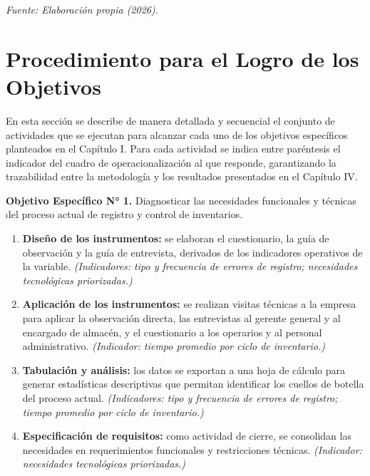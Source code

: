 \documentclass[12pt, letterpaper]{report}
\begin{document}
\noindent\small\textit{Fuente: Elaboración propia (2026).}
\normalsize

\section{Procedimiento para el Logro de los Objetivos}

En esta sección se describe de manera detallada y secuencial el conjunto
de actividades que se ejecutan para alcanzar cada uno de los objetivos
específicos planteados en el Capítulo I. Para cada actividad se indica
entre paréntesis el indicador del cuadro de operacionalización al que
responde, garantizando la trazabilidad entre la metodología y los
resultados presentados en el Capítulo IV.

\noindent\textbf{Objetivo Específico N° 1.} Diagnosticar las
necesidades funcionales y técnicas del proceso actual de registro y
control de inventarios.

\begin{enumerate}
  \item \textbf{Diseño de los instrumentos:} se elaboran el
        cuestionario, la guía de observación y la guía de entrevista,
        derivados de los indicadores operativos de la variable.
        \textit{(Indicadores: tipo y frecuencia de errores de registro;
        necesidades tecnológicas priorizadas.)}

  \item \textbf{Aplicación de los instrumentos:} se realizan visitas
        técnicas a la empresa para aplicar la observación directa, las
        entrevistas al gerente general y al encargado de almacén, y el
        cuestionario a los operarios y al personal administrativo.
        \textit{(Indicador: tiempo promedio por ciclo de inventario.)}

  \item \textbf{Tabulación y análisis:} los datos se exportan a una
        hoja de cálculo para generar estadísticas descriptivas que
        permitan identificar los cuellos de botella del proceso actual.
        \textit{(Indicadores: tipo y frecuencia de errores de registro;
        tiempo promedio por ciclo de inventario.)}

  \item \textbf{Especificación de requisitos:} como actividad de cierre,
        se consolidan las necesidades en requerimientos funcionales y
        restricciones técnicas. \textit{(Indicador: necesidades
        tecnológicas priorizadas.)}
\end{enumerate}
\end{document}
